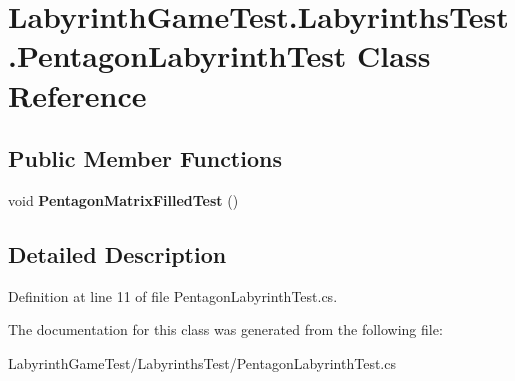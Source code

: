 \hypertarget{class_labyrinth_game_test_1_1_labyrinths_test_1_1_pentagon_labyrinth_test}{\section{Labyrinth\+Game\+Test.\+Labyrinths\+Test.\+Pentagon\+Labyrinth\+Test Class Reference}
\label{class_labyrinth_game_test_1_1_labyrinths_test_1_1_pentagon_labyrinth_test}
}
\subsection*{Public Member Functions}
\begin{DoxyCompactItemize}
\item 
\hypertarget{class_labyrinth_game_test_1_1_labyrinths_test_1_1_pentagon_labyrinth_test_ad8899b3caedbc54c6a9fa8422127c334}{void {\bfseries Pentagon\+Matrix\+Filled\+Test} ()}\label{class_labyrinth_game_test_1_1_labyrinths_test_1_1_pentagon_labyrinth_test_ad8899b3caedbc54c6a9fa8422127c334}

\end{DoxyCompactItemize}


\subsection{Detailed Description}


Definition at line 11 of file Pentagon\+Labyrinth\+Test.\+cs.



The documentation for this class was generated from the following file\+:\begin{DoxyCompactItemize}
\item 
Labyrinth\+Game\+Test/\+Labyrinths\+Test/Pentagon\+Labyrinth\+Test.\+cs\end{DoxyCompactItemize}
